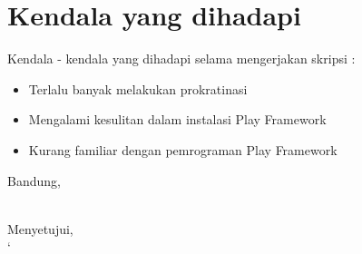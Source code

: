 \documentclass[a4paper,twoside]{article}
\begin{document}
\section{Kendala yang dihadapi}
Kendala - kendala yang dihadapi selama mengerjakan skripsi :
\begin{itemize}
	\item Terlalu banyak melakukan prokratinasi
	\item Mengalami kesulitan dalam instalasi Play Framework
	\item Kurang familiar dengan pemrograman Play Framework
\end{itemize}

\vspace{1cm}
\centering Bandung, \tanggal\\
\vspace{1.8cm} \nama \\ 
\vspace{1cm}

Menyetujui, \\
`
\end{document}
